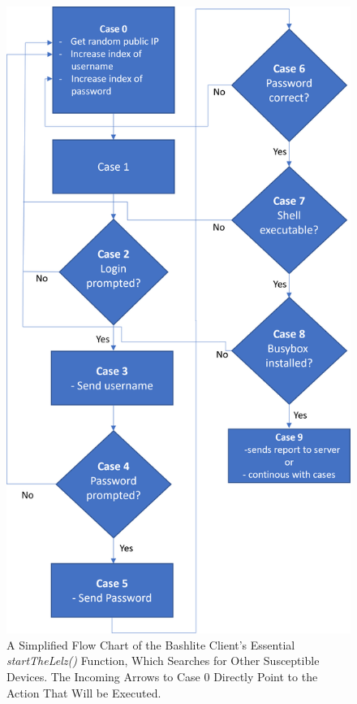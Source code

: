 \begin{figure}[tph]
\includegraphics[scale=0.8]{assets/flowChartClient.png}
\centering
\caption{A Simplified Flow Chart of the Bashlite Client's Essential 	\textit{startTheLelz()} Function, Which Searches for Other Susceptible Devices. The Incoming Arrows to Case 0 Directly Point to the Action That Will be Executed.}
    \label{graphic:flowChartClient}
\end{figure}


